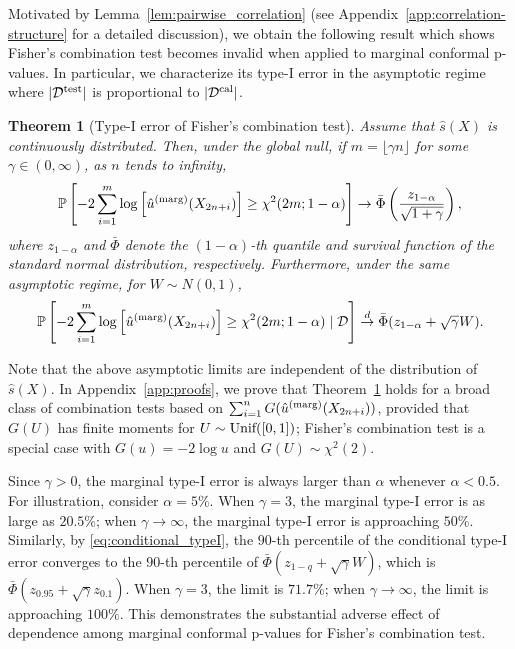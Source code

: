 \documentclass[11pt]{article}
\newtheorem{thm}{Theorem}
\newcommand{\Unif}{\textnormal{Unif}}
\def\marg{\textnormal{(marg)}}
\renewcommand{\P}{\mathbb{P}}
\begin{document}
Motivated by Lemma~\ref{lem:pairwise_correlation} (see Appendix~\ref{app:correlation-structure} for a detailed discussion), we obtain the following result which shows Fisher's combination test becomes invalid when applied to marginal conformal p-values. In particular, we characterize its type-I error in the asymptotic regime where $|\mathcal{D}^{\textnormal{test}}|$ is proportional to $|\mathcal{D}^{\textnormal{cal}}|$.
\begin{thm}[Type-I error of Fisher's combination test]\label{thm:fisher}
Assume that $\hat{s}(X)$ is continuously distributed. Then, under the global null, if $m = \lfloor\gamma n\rfloor$ for some $\gamma \in (0, \infty)$, as $n$ tends to infinity, 
\begin{equation*}
\P\left[ -2 \sum_{i=1}^{m} \log \left[ \hat{u}^\marg(X_{2n+i}) \right] \ge \chi^2(2m; 1 - \alpha) \right] \rightarrow  \bar{\Phi}\left(\frac{z_{1 - \alpha}}{\sqrt{1 + \gamma}}\right),
\end{equation*}
where $z_{1 - \alpha}$ and $\bar{\Phi}$ denote the $(1 - \alpha)$-th quantile and survival function of the standard normal distribution, respectively. Furthermore, under the same asymptotic regime, for $W\sim N(0, 1)$,
\begin{equation}\label{eq:conditional_typeI}
\P\left[ -2 \sum_{i=1}^{m} \log \left[\hat{u}^\marg(X_{2n+i})\right] \ge \chi^2(2m; 1 - \alpha)\mid \mathcal{D} \right] \stackrel{d}{\rightarrow}\bar{\Phi}(z_{1 - \alpha} + \sqrt{\gamma} W).
\end{equation}
\end{thm}
Note that the above asymptotic limits are independent of the distribution of $\hat{s}(X)$. In Appendix~\ref{app:proofs}, we prove that Theorem~\ref{thm:fisher} holds for a broad class of combination tests based on $\sum_{i=1}^{n}G(\hat{u}^\marg(X_{2n+i}))$, provided that $G(U)$ has finite moments for $U\sim \Unif([0, 1])$; Fisher's combination test is a special case with $G(u) = -2\log u$ and $G(U)\sim \chi^2(2)$. 

 Since $\gamma > 0$, the marginal type-I error is always larger than $\alpha$ whenever $\alpha < 0.5$. For illustration, consider $\alpha = 5\%$. When $\gamma = 3$, the marginal type-I error is as large as $20.5\%$; when $\gamma \rightarrow\infty$, the marginal type-I error is approaching $50\%$. Similarly, by \eqref{eq:conditional_typeI}, the $90$-th percentile of the conditional type-I error converges to the $90$-th percentile of $\bar{\Phi}(z_{1 - q} + \sqrt{\gamma} W)$, which is $\bar{\Phi}(z_{0.95} + \sqrt{\gamma}z_{0.1})$. When $\gamma = 3$, the limit is $71.7\%$; when $\gamma \rightarrow \infty$, the limit is approaching $100\%$. This demonstrates the substantial adverse effect of dependence among marginal conformal p-values for Fisher's combination test.
\end{document}
